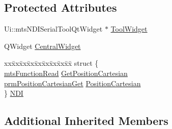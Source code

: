\subsection*{Protected Attributes}
\begin{DoxyCompactItemize}
\item 
Ui\-::mts\-N\-D\-I\-Serial\-Tool\-Qt\-Widget $\ast$ \hyperlink{classmts_n_d_i_serial_tool_qt_component_af967ad37bf503470a35cb6fd9b6bd247}{Tool\-Widget}
\item 
Q\-Widget \hyperlink{classmts_n_d_i_serial_tool_qt_component_ae0c40b10c41b0859fd974923538e77aa}{Central\-Widget}
\item 
\begin{tabbing}
xx\=xx\=xx\=xx\=xx\=xx\=xx\=xx\=xx\=\kill
struct \{\\
\>\hyperlink{classmts_function_read}{mtsFunctionRead} \hyperlink{classmts_n_d_i_serial_tool_qt_component_a71bcb12553a365aadbb331892c63c734}{GetPositionCartesian}\\
\>\hyperlink{classprm_position_cartesian_get}{prmPositionCartesianGet} \hyperlink{classmts_n_d_i_serial_tool_qt_component_aeeeb01caede4ad7c1b9861e6b5325941}{PositionCartesian}\\
\} \hyperlink{classmts_n_d_i_serial_tool_qt_component_adb18196a65b8d97ec4df359d9ab30015}{NDI}\\

\end{tabbing}\end{DoxyCompactItemize}
\subsection*{Additional Inherited Members}


